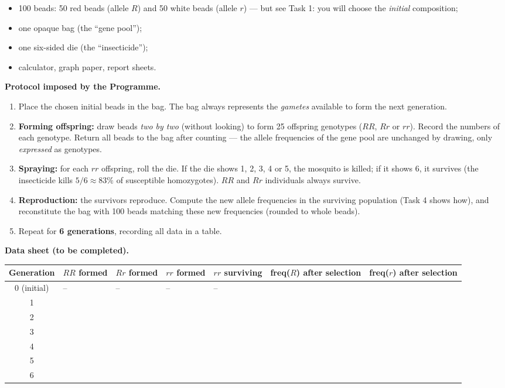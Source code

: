 \documentclass[11pt]{article}
\begin{document}
\begin{itemize}
\item 100 beads: 50 red beads (allele $R$) and 50 white beads (allele $r$) --- but see Task 1: you will choose the \emph{initial} composition;
\item one opaque bag (the ``gene pool'');
\item one six-sided die (the ``insecticide'');
\item calculator, graph paper, report sheets.
\end{itemize}

\textbf{Protocol imposed by the Programme.}

\begin{enumerate}
\item Place the chosen initial beads in the bag. The bag always represents the \emph{gametes} available to form the next generation.
\item \textbf{Forming offspring:} draw beads \emph{two by two} (without looking) to form 25 offspring genotypes ($RR$, $Rr$ or $rr$). Record the numbers of each genotype. Return all beads to the bag after counting --- the allele frequencies of the gene pool are unchanged by drawing, only \emph{expressed} as genotypes.
\item \textbf{Spraying:} for each $rr$ offspring, roll the die. If the die shows 1, 2, 3, 4 or 5, the mosquito is killed; if it shows 6, it survives (the insecticide kills $5/6 \approx 83\%$ of susceptible homozygotes). $RR$ and $Rr$ individuals always survive.
\item \textbf{Reproduction:} the survivors reproduce. Compute the new allele frequencies in the surviving population (Task 4 shows how), and reconstitute the bag with 100 beads matching these new frequencies (rounded to whole beads).
\item Repeat for \textbf{6 generations}, recording all data in a table.
\end{enumerate}

\textbf{Data sheet (to be completed).}

\begin{center}
\begin{tabularx}{\linewidth}{|c|X|X|X|X|X|X|}
\hline
\rowcolor{popblueL} Generation & $RR$ formed & $Rr$ formed & $rr$ formed & $rr$ surviving & freq($R$) after selection & freq($r$) after selection \\
\hline
0 (initial) & -- & -- & -- & -- & & \\
\hline
1 & & & & & & \\
\hline
2 & & & & & & \\
\hline
3 & & & & & & \\
\hline
4 & & & & & & \\
\hline
5 & & & & & & \\
\hline
6 & & & & & & \\
\hline
\end{tabularx}
\end{center}
\end{document}
